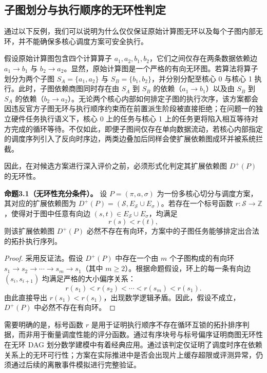 \documentclass[anonymous,notoc]{gmcm2026}
\begin{document}
\subsection{子图划分与执行顺序的无环性判定}

通过以下反例，我们可以说明为什么仅仅保证原始计算图无环以及每个子图内部无环，并不能确保多核心调度方案可安全执行。

假设原始计算图包含四个计算算子 \(a_1, a_2, b_1, b_2\)，它们之间仅存在两条数据依赖边 \(a_1 \to b_1\) 与 \(b_2 \to a_2\)。显然，原始计算图是一个严格的有向无环图。若算法将算子划分为两个子图 \(S_A = \{a_1, a_2\}\) 与 \(S_B = \{b_1, b_2\}\)，并分别分配至核心 0 与核心 1 执行。此时，子图依赖商图同时存在由 \(S_A\) 到 \(S_B\) 的依赖（\(a_1 \to b_1\)）以及由 \(S_B\) 到 \(S_A\) 的依赖（\(b_2 \to a_2\)）。无论两个核心内部如何排定子图的执行次序，该方案都会因违反官方子图无环与执行顺序约束而在前置派生阶段被直接拒绝；在问题一的独立硬件任务执行语义下，核心 0 上的任务与核心 1 上的任务更将陷入相互等待对方完成的循环等待。不仅如此，即便子图间仅存在单向数据流动，若核心内部指定的调度序列引入了反向时序边，两类边叠加后同样会使扩展依赖图成环并被系统拦截。

因此，在对候选方案进行深入评价之前，必须形式化判定其扩展依赖图 \(D^+(P)\) 的无环性。

\textbf{命题3.1（无环性充分条件）。} 设 \(P = (\pi, a, \sigma)\) 为一份多核心切分与调度方案，其对应的扩展依赖图为 \(D^+(P) = (\mathcal{S}, E_{\mathcal{S}} \cup E_\sigma)\)。若存在一个标号函数 \(r: \mathcal{S} \to \mathbb{Z}\)，使得对于图中任意有向边 \((s, t) \in E_{\mathcal{S}} \cup E_\sigma\)，均满足 \begin{equation}
r(s) < r(t),
\end{equation} 则该扩展依赖图 \(D^+(P)\) 必然不存在有向环，方案中的子图任务能够排定出合法的拓扑执行序列。

\begin{proof} 采用反证法。假设 \(D^+(P)\) 中存在一个由 \(m\) 个子图构成的有向环 \(s_1 \to s_2 \to \cdots \to s_m \to s_1\)（其中 \(m \ge 2\)）。根据命题假设，环上的每一条有向边 \((s_i, s_{i+1})\) 均满足严格的大小偏序关系： \begin{equation}
r(s_1) < r(s_2) < \cdots < r(s_m) < r(s_1).
\end{equation} 由此直接导出 \(r(s_1) < r(s_1)\)，出现数学逻辑矛盾。因此，假设不成立，\(D^+(P)\) 中必然不存在有向环。 \end{proof}

需要明确的是，标号函数 \(r\) 是用于证明执行顺序不存在循环互锁的拓扑排序判据，而非用于衡量调度性能的评分函数。通过有序块号与标号偏序证明商图无环性在无环 DAG 划分数学建模中有着经典应用\cite{ref7}。通过该判定仅证明了调度时序在依赖关系上的无环可行性；方案在实际推进中是否会出现片上缓存超限或评测异常，仍须通过后续的离散事件模拟进行完整验证。
\end{document}
